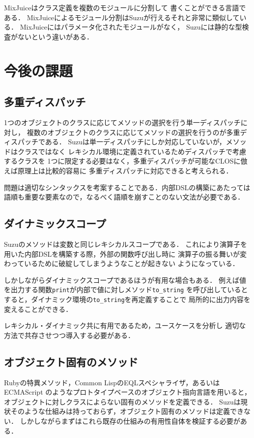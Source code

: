 \documentclass[a4paper,11pt,dvipdfmx]{jreport}
\begin{document}
MixJuice\cite{MixJuice}はクラス定義を複数のモジュールに分割して
書くことができる言語である．
MixJuiceによるモジュール分割はSuzuが行えるそれと非常に類似している．
MixJuiceにはパラメータ化されたモジュールがなく，
Suzuには静的な型検査がないという違いがある．


\chapter{今後の課題}
\label{chapter:future-work}

\section{多重ディスパッチ}

1つのオブジェクトのクラスに応じてメソッドの選択を行う単一ディスパッチに対し，
複数のオブジェクトのクラスに応じてメソッドの選択を行うのが多重ディスパッチである．
Suzuは単一ディスパッチにしか対応していないが，メソッドはクラスではなく
レキシカル環境に定義されているためディスパッチで考慮するクラスを
1つに限定する必要はなく，多重ディスパッチが可能なCLOSに倣えば原理上は比較的容易に
多重ディスパッチに対応できると考えられる．

問題は適切なシンタックスを考案することである．内部DSLの構築にあたっては
語順も重要な要素なので，なるべく語順を崩すことのない文法が必要である．

\section{ダイナミックスコープ}

Suzuのメソッドは変数と同じレキシカルスコープである．
これにより演算子を用いた内部DSLを構築する際，外部の関数呼び出し時に
演算子の振る舞いが変わっているために破綻してしまうようなことが起きない
ようになっている．

しかしながらダイナミックスコープであるほうが有用な場合もある．
例えば値を出力する関数\verb|print|が内部で値に対しメソッド\verb|to_string|
を呼び出しているとすると，ダイナミック環境の\verb|to_string|を再定義することで
局所的に出力内容を変えることができる．

レキシカル・ダイナミック共に有用であるため，ユースケースを分析し
適切な方法で共存させつつ導入する必要がある．

\section{オブジェクト固有のメソッド}

Rubyの特異メソッド，Common LispのEQLスペシャライザ，あるいはECMAScript
\cite{ECMAScript}のようなプロトタイプベースのオブジェクト指向言語を用いると，
オブジェクトに対しクラスによらない固有のメソッドを定義できる．
Suzuは現状そのような仕組みは持っておらず，オブジェクト固有のメソッドは定義できない．
しかしながらまずはこれら既存の仕組みの有用性自体を検証する必要がある．
\end{document}

